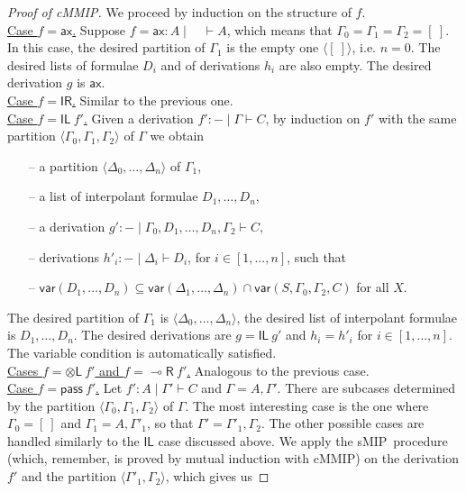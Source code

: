 \documentclass[sn-mathphys-num]{sn-jnl}%
\newcommand{\GG}{\Gamma}
\newcommand{\GD}{\Delta}
\newcommand{\vd}{\vdash}
\newcommand{\tl}{\otimes \mathsf{L}}
\newcommand{\pass}{\mathsf{pass}}
\newcommand{\unitl}{\mathsf{IL}}
\newcommand{\unitr}{\mathsf{IR}}
\newcommand{\ax}{\mathsf{ax}}
\newcommand{\lolli}{\multimap}
\newcommand{\lright}{{\lolli}\mathsf{R}}
\newcommand{\mf}[1]{\mathsf{#1}}
\newcommand{\gs}[1]{\sigma_{X} (#1)}
\newcommand{\vars}[1]{\mf{var} (#1)}
\newcommand{\sMIP}{\textsf{sMIP}}
\newcommand{\cMMIP}{\textsf{cMMIP}}
\theoremstyle{thmstyleone}%
\theoremstyle{thmstyletwo}%
\theoremstyle{thmstylethree}%
\begin{document}
\begin{proof}[Proof of \cMMIP]
  We proceed by induction on the structure of $f$. 
  \\
  \underline{Case $f  = \ax$.}
  Suppose $f = \ax : A \mid \quad \vd A$, which means that $\GG_0 = \GG_1 = \GG_2 = [\ ]$.
  In this case, the desired partition of $\GG_1$ is the empty one $\langle [\ ] \rangle$, i.e. $n=0$. The desired lists of formulae $D_i$ and of derivations $h_i$ are also empty. The desired derivation $g$ is $\ax$.
  \\
  \underline{Case $f = \unitr$.} Similar to the previous one.
  \\
  \underline{Case $f = \unitl \ f'$.}
  Given a derivation $f' : {-} \mid \GG \vd C$, by induction on $f'$ with the same partition $\langle \GG_0, \GG_1, \GG_2 \rangle$ of $\GG$ we obtain  
  \begin{itemize}
    \item[--] a partition $\langle \GD_0, \dots , \GD_n \rangle$ of $\GG_1$, 
    \item[--] a list of interpolant formulae $D_1, \dots , D_n$,
    \item[--] a derivation $g' : {-} \mid \GG_0 , D_1 , \dots , D_n , \GG_2 \vd C$,
    \item[--] derivations $h'_i : {-} \mid \GD_i \vd D_i$, for $i \in [1,\dots , n]$, such that
    \item[--] $\vars{D_1, \dots, D_n} \subseteq \vars{\GD_1 , \dots , \GD_n} \cap \vars{S, \GG_0, \GG_2, C}$ for all  $X$.
  \end{itemize}
  The desired partition of $\GG_1$ is $\langle \GD_0, \dots , \GD_n \rangle$, the desired list of interpolant formulae is $D_1,\dots,D_n$.
  The desired derivations are $g = \unitl \ g'$ and $h_i = h'_i$ for $i \in [1,\dots , n]$.
  The variable condition is automatically satisfied.
  \\
  \underline{Cases $f = \tl \ f'$ and $f = \lright \ f'$.} Analogous to the previous case.
  \\
  \underline{Case $f = \pass \ f'$.}
  Let $f' : A \mid \GG' \vd C$ and $\GG = A,\GG'$. There are subcases determined by the partition $\langle \GG_0,\GG_1,\GG_2 \rangle$ of $\GG$.
  The most interesting case is the one where $\GG_0 = [\ ]$ and $\GG_1 = A,\GG'_1$, so that $\GG' = \GG'_1,\GG_2$. The other possible cases are handled similarly to the $\unitl$ case discussed above.
  We apply the \sMIP~procedure (which, remember, is proved by mutual induction with \cMMIP) on the derivation $f'$ and the partition $\langle \GG'_1,\GG_2 \rangle$, which gives us

\end{proof}
\end{document}
